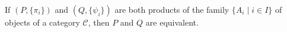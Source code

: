 \begin{theorem}
If $(P, \{\pi_i\})$ and $(Q, \{\psi_i\})$ are both products of the family $\{A_i \mid i \in I\}$ of objects of a category $\mathcal{C}$, then $P$ and $Q$ are equivalent.
\end{theorem}
